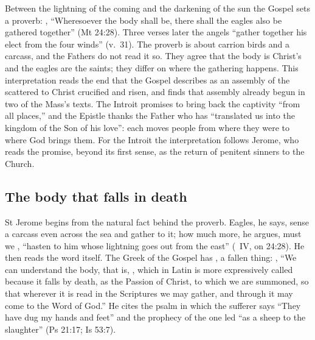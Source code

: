
Between the lightning of the coming and the darkening of the sun the Gospel
sets a proverb: , ``Wheresoever the body shall be, there shall the eagles also be
gathered together'' (Mt 24:28). Three verses later the angels ``gather together
his elect from the four winds'' (v.~31). The proverb is about carrion birds and
a carcass, and the Fathers do not read it so. They agree that the body is
Christ's and the eagles are the saints; they differ on where the gathering
happens. This interpretation reads the end that the Gospel describes as an
assembly of the scattered to Christ crucified and risen, and finds that
assembly already begun in two of the Mass's texts. The Introit promises to
bring back the captivity ``from all places,'' and the Epistle thanks the
Father who has ``translated us into the kingdom of the Son of his love'':
each moves people from where they were to where God brings them. For the
Introit the interpretation follows Jerome, who reads the promise, beyond its
first sense, as the return of penitent sinners to the Church.

\subsection{The body that falls in death}
\label{sec:body-jerome}

St Jerome begins from the natural fact behind the proverb. Eagles, he says,
sense a carcass even across the sea and gather to it; how much more, he
argues, must we ,
``hasten to him whose lightning goes out from the east'' (~IV, on 24:28). He then reads the word itself. The Greek of the
Gospel has , a fallen thing: ,
``We can understand the body, that is, , which in Latin is more
expressively called  because it falls by death, as the Passion
of Christ, to which we are summoned, so that wherever it is read in the
Scriptures we may gather, and through it may come to the Word of God.'' He
cites the psalm in which the sufferer says ``They have dug my hands
and feet'' and the prophecy of the one led ``as a sheep to the slaughter'' (Ps
21:17; Is 53:7).

